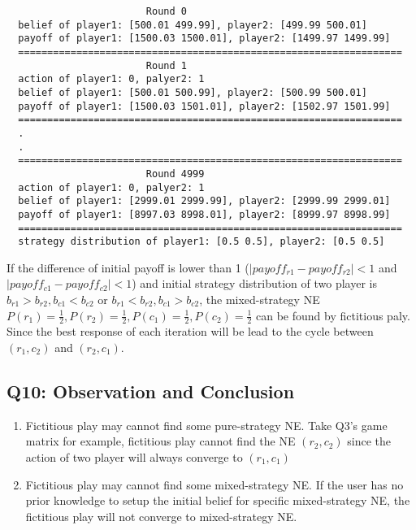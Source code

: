 \documentclass[a4paper, oneside, final, 12pt]{scrartcl} %
\begin{document}
\begin{lstlisting}
                        Round 0
  belief of player1: [500.01 499.99], player2: [499.99 500.01]
  payoff of player1: [1500.03 1500.01], player2: [1499.97 1499.99]
  ==================================================================
                        Round 1
  action of player1: 0, palyer2: 1
  belief of player1: [500.01 500.99], player2: [500.99 500.01]
  payoff of player1: [1500.03 1501.01], player2: [1502.97 1501.99]
  ==================================================================
  .
  .
  ==================================================================
                        Round 4999
  action of player1: 0, palyer2: 1
  belief of player1: [2999.01 2999.99], player2: [2999.99 2999.01]
  payoff of player1: [8997.03 8998.01], player2: [8999.97 8998.99]
  ==================================================================
  strategy distribution of player1: [0.5 0.5], player2: [0.5 0.5]
\end{lstlisting}

\begingroup
\raggedright
If the difference of initial payoff is lower than 1
($|payoff_{r1} - payoff_{r2}| < 1$ and $|payoff_{c1} - payoff_{c2}| < 1$)
and initial strategy distribution of two player is 
$b_{r1} > b_{r2}, b_{c1} < b_{c2}$  or  $b_{r1} < b_{r2}, b_{c1} > b_{c2}$, 
the mixed-strategy NE $P(r_1) = \frac{1}{2}, P(r_2) = \frac{1}{2}, 
P(c_1) = \frac{1}{2}, P(c_2) = \frac{1}{2}$ can be found by fictitious paly.
Since the best response of each iteration will be lead to the cycle 
between $(r_1, c_2)$ and $(r_2, c_1)$.
\endgroup

\subsection{Q10: Observation and Conclusion}

\begin{enumerate}
  \item Fictitious play may cannot find some pure-strategy NE.
  Take Q3's game matrix for example, fictitious play cannot find the NE $(r_2, c_2)$
  since the action of two player will always converge to $(r_1, c_1)$
  \item Fictitious play may cannot find some mixed-strategy NE.
  If the user has no prior knowledge to setup the initial belief for specific mixed-strategy NE,
  the fictitious play will not converge to mixed-strategy NE.
\end{enumerate}

\end{document}
